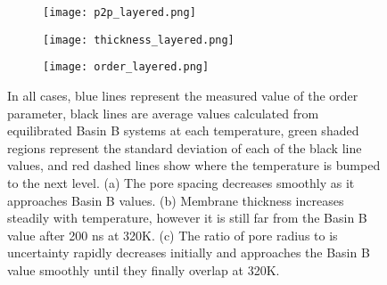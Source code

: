 \begin{figure}
	\centering
	\begin{subfigure}{0.325\textwidth}
		\centering
		\texttt{[image: p2p\_layered.png]}
		\caption{}\label{fig:p2p_layered}
	\end{subfigure}
	\begin{subfigure}{0.325\textwidth}
		\centering
		\texttt{[image: thickness\_layered.png]}
		\caption{}\label{fig:thickness_layered}
	\end{subfigure}
	\begin{subfigure}{0.325\textwidth}
		\centering
		\texttt{[image: order\_layered.png]}
		\caption{}\label{fig:order_layered}
	\end{subfigure}
	\caption{In all cases, blue lines represent the measured value of
	the order parameter, black lines are average values calculated from
	equilibrated Basin B systems at each temperature, green shaded regions
	represent the standard deviation of each of the black line values, and 
	red dashed lines show where the temperature is bumped to the next level.
	(a) The pore spacing decreases smoothly as it approaches Basin B values.
	(b) Membrane thickness increases steadily with temperature, however
	it is still far from the Basin B value after 200 ns at 320K. (c) The
	ratio of pore radius to is uncertainty rapidly decreases initially and
	approaches the Basin B value smoothly until they finally overlap at 320K.}\label{fig:phase_transition}
\end{figure}
